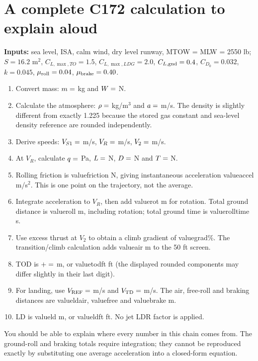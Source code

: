 \documentclass[11pt,letterpaper]{article}
\newcommand{\val}[1]{\csname value#1\endcsname}
\newcommand{\topic}[1]{\clearpage\section{#1}}
\begin{document}
\topic{A complete C172 calculation to explain aloud}
\textbf{Inputs:} sea level, ISA, calm wind, dry level runway, MTOW = MLW = 2550 lb;
$S=16.2$ m$^2$, $C_{L,\max,TO}=1.5$, $C_{L,\max,LDG}=2.0$,
$C_{L,\rm gnd}=0.4$, $C_{D_0}=0.032$, $k=0.045$,
$\mu_{\rm roll}=0.04$, $\mu_{\rm brake}=0.40$.
\begin{enumerate}
\item Convert mass: $m=\val{mass}$ kg and $W=\val{weight}$ N.
\item Calculate the atmosphere: $\rho=\val{rho}$ kg/m$^3$ and $a=\val{sound}$ m/s.
The density is slightly different from exactly 1.225 because the stored gas
constant and sea-level density reference are rounded independently.
\item Derive speeds: $V_{S1}=\val{vs}$ m/s, $V_R=\val{vr}$ m/s,
$V_2=\val{vtwo}$ m/s.
\item At $V_R$, calculate $q=\val{q}$ Pa, $L=\val{lift}$ N,
$D=\val{drag}$ N and $T=\val{thrust}$ N.
\item Rolling friction is \val{friction} N, giving instantaneous acceleration
\val{accel} m/s$^2$. This is one point on the trajectory, not the average.
\item Integrate acceleration to $V_R$, then add \val{rot} m for rotation.
Total ground distance is \val{roll} m, including rotation; total ground time
is \val{rolltime} s.
\item Use excess thrust at $V_2$ to obtain a climb gradient of \val{grad}\%.
The transition/climb calculation adds \val{air} m to the 50 ft screen.
\item TOD is $\val{roll}+\val{air}=\val{tod}$ m, or \val{todft} ft
(the displayed rounded components may differ slightly in their last digit).
\item For landing, use $V_{\rm REF}=\val{vref}$ m/s and
$V_{\rm TD}=\val{vtd}$ m/s. The air, free-roll and braking distances are
\val{ldair}, \val{free} and \val{brake} m.
\item LD is \val{ld} m, or \val{ldft} ft. No jet LDR factor is applied.
\end{enumerate}
\begin{keyidea}
You should be able to explain where every number in this chain comes from.
The ground-roll and braking totals require integration; they cannot be reproduced
exactly by substituting one average acceleration into a closed-form equation.
\end{keyidea}
\end{document}
